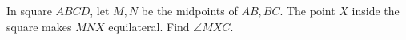 In square $ABCD$, let $M,N$ be the midpoints of $AB,BC$. The point $X$ inside the square makes $MNX$ equilateral. Find $\angle MXC$.

